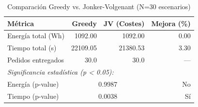 \begin{table}[htbp]
\centering
\caption{Comparación Greedy vs. Jonker-Volgenant (N=30 escenarios)}
\label{tab:comparison}
\begin{tabular}{lrrr}
\hline
\textbf{Métrica} & \textbf{Greedy} & \textbf{JV (Costes)} & \textbf{Mejora (\%)} \\
\hline
Energía total (Wh) & 1092.00 & 1092.00 & 0.00 \\
Tiempo total (s) & 22109.05 & 21380.53 & 3.30 \\
Pedidos entregados & 30.0 & 30.0 & — \\
\hline
\multicolumn{4}{l}{\textit{Significancia estadística (p < 0.05):}} \\
Energía (p-value) & \multicolumn{2}{c}{0.9987} & No \\
Tiempo (p-value) & \multicolumn{2}{c}{0.0038} & Sí \\
\hline
\end{tabular}
\end{table}